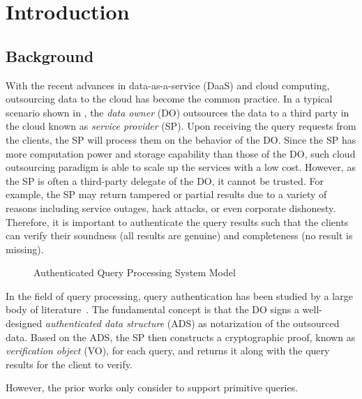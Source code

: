 \chapter{Introduction}\label{chap:intro}

\section{Background}

With the recent advances in data-as-a-service (DaaS) and cloud computing, outsourcing data to the cloud has become the common practice. In a typical scenario shown in , the \emph{data owner} (DO) outsources the data to a third party in the cloud known as \emph{service provider} (SP). Upon receiving the query requests from the clients, the SP will process them on the behavior of the DO\@. Since the SP has more computation power and storage capability than those of the DO, such cloud outsourcing paradigm is able to scale up the services with a low cost. However, as the SP is often a third-party delegate of the DO, it cannot be trusted. For example, the SP may return tampered or partial results due to a variety of reasons including service outages, hack attacks, or even corporate dishonesty. Therefore, it is important to authenticate the query results such that the clients can verify their soundness (all results are genuine) and completeness (no result is missing).

\begin{figure}[h]
  \centering
  \resizebox{.7\linewidth}{!}{}
  \caption{Authenticated Query Processing System Model}\label{fig:intro:model}
\end{figure}

In the field of query processing, query authentication has been studied by a large body of literature~\cite{10.1109/ICDE.2004.1320027,10.1145/1142473.1142488,10.1007/s00778-008-0113-2,10.1145/1880022.1880026,10.1145/2213836.2213871,10.1145/2463676.2465281,10.14778/2732219.2732224,10.1145/2664243.2664244,10.1145/2723372.2747649,10.1109/tkde.2014.2316818}. The fundamental concept is that the DO signs a well-designed \emph{authenticated data structure} (ADS) as notarization of the outsourced data. Based on the ADS, the SP then constructs a cryptographic proof, known as \emph{verification object} (VO), for each query, and returns it along with the query results for the client to verify.

However, the prior works only consider to support primitive queries.

